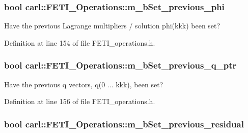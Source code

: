 \subsubsection[{m\+\_\+b\+Set\+\_\+previous\+\_\+phi}]{\setlength{\rightskip}{0pt plus 5cm}bool carl\+::\+F\+E\+T\+I\+\_\+\+Operations\+::m\+\_\+b\+Set\+\_\+previous\+\_\+phi\hspace{0.3cm}{\ttfamily [protected]}}\label{classcarl_1_1_f_e_t_i___operations_a76ef85eba8cceba4cfc8bc167d8dd73f}


Have the previous Lagrange multipliers / solution {\ttfamily phi(kkk)} been set? 



Definition at line 154 of file F\+E\+T\+I\+\_\+operations.\+h.

\hypertarget{classcarl_1_1_f_e_t_i___operations_a9bacd2df5ed75055635acc7336c96bef}{}
\subsubsection[{m\+\_\+b\+Set\+\_\+previous\+\_\+q\+\_\+ptr}]{\setlength{\rightskip}{0pt plus 5cm}bool carl\+::\+F\+E\+T\+I\+\_\+\+Operations\+::m\+\_\+b\+Set\+\_\+previous\+\_\+q\+\_\+ptr\hspace{0.3cm}{\ttfamily [protected]}}\label{classcarl_1_1_f_e_t_i___operations_a9bacd2df5ed75055635acc7336c96bef}


Have the previous {\ttfamily q} vectors, {\ttfamily q(0 ... kkk)}, been set? 



Definition at line 156 of file F\+E\+T\+I\+\_\+operations.\+h.

\hypertarget{classcarl_1_1_f_e_t_i___operations_a2368fc7147e38fa780d89e0b2c676d5d}{}
\subsubsection[{m\+\_\+b\+Set\+\_\+previous\+\_\+residual}]{\setlength{\rightskip}{0pt plus 5cm}bool carl\+::\+F\+E\+T\+I\+\_\+\+Operations\+::m\+\_\+b\+Set\+\_\+previous\+\_\+residual\hspace{0.3cm}{\ttfamily [protected]}}\label{classcarl_1_1_f_e_t_i___operations_a2368fc7147e38fa780d89e0b2c676d5d}


